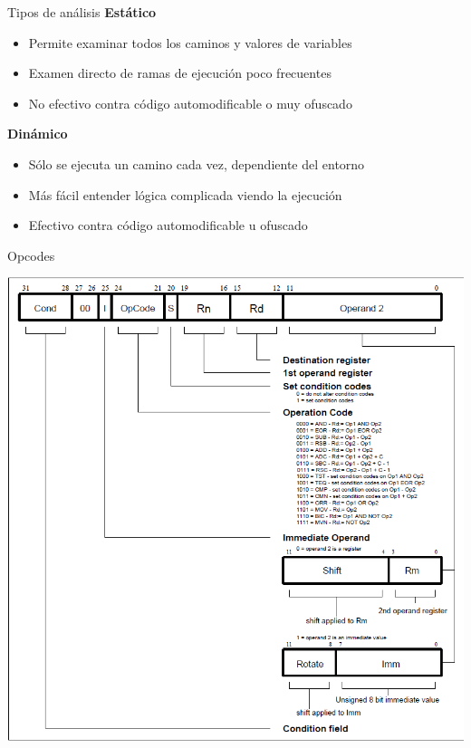 \documentclass{beamer}
\begin{document}
\begin{frame}{Tipos de análisis}
\vspace{-3ex}
\textbf{Estático}
\begin{itemize}
	\item Permite examinar todos los caminos y valores de variables
	\item Examen directo de ramas de ejecución poco frecuentes
	\item No efectivo contra código automodificable o muy ofuscado
\end{itemize}
\textbf{Dinámico}
\begin{itemize}
	\item Sólo se ejecuta un camino cada vez, dependiente del entorno
	\item Más fácil entender lógica complicada viendo la ejecución
	\item Efectivo contra código automodificable u ofuscado
\end{itemize}

\end{frame}

\begin{frame}{Opcodes}

\begin{center}
\includegraphics[scale=0.3]{0cPOx.png}
\end{center}

\end{frame}
\end{document}
